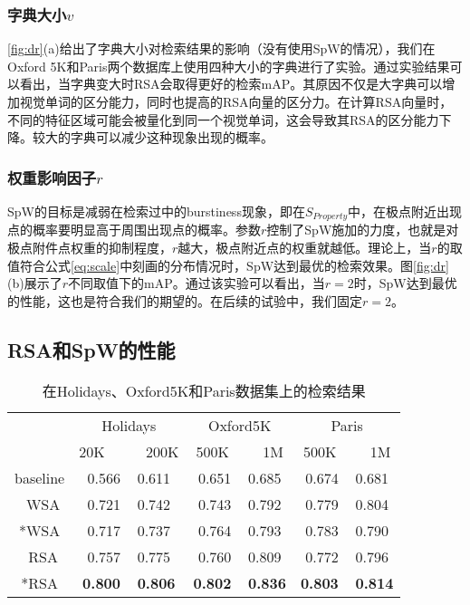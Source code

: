 \subsubsection{字典大小$v$}
\ref{fig:dr}(a)给出了字典大小对检索结果的影响（没有使用SpW的情况），我们在Oxford 5K和Paris两个数据库上使用四种大小的字典进行了实验。通过实验结果可以看出，当字典变大时RSA会取得更好的检索mAP。其原因不仅是大字典可以增加视觉单词的区分能力，同时也提高的RSA向量的区分力。在计算RSA向量时，不同的特征区域可能会被量化到同一个视觉单词，这会导致其RSA的区分能力下降。较大的字典可以减少这种现象出现的概率。

\subsubsection{权重影响因子$r$}
SpW的目标是减弱在检索过中的burstiness现象，即在$S_{Property}$中，在极点附近出现点的概率要明显高于周围出现点的概率。参数$r$控制了SpW施加的力度，也就是对极点附件点权重的抑制程度，$r$越大，极点附近点的权重就越低。理论上，当$r$的取值符合公式\ref{eq:scale}中刻画的分布情况时，SpW达到最优的检索效果。图\ref{fig:dr}(b)展示了$r$不同取值下的mAP。通过该实验可以看出，当$r=2$时，SpW达到最优的性能，这也是符合我们的期望的。在后续的试验中，我们固定$r=2$。

\subsection{RSA和SpW的性能}
\begin{table}
	\begin{center}
		\begin{tabular}{|c|c|c|c|}
			\hline
			& Holidays       & Oxford5K         & Paris\\
			& 20K~~~~~ 200K  & 500K~~~~ 1M    & 500K~~~~ 1M\\
			\hline\hline
			baseline  & 0.566 ~ 0.611  & 0.651 ~ 0.685  & 0.674 ~ 0.681\\
			\hline
			~WSA      & 0.721 ~ 0.742  & 0.743 ~ 0.792  & 0.779 ~ 0.804\\
			*WSA      & 0.717 ~ 0.737  & 0.764 ~ 0.793  & 0.783 ~ 0.790\\
			\hline
			~RSA      & 0.757 ~ 0.775  & 0.760 ~ 0.809  & 0.772 ~ 0.796\\
			*RSA      & \textbf{0.800} ~ \textbf{0.806} & \textbf{0.802} ~ \textbf{0.836} & \textbf{0.803} ~ \textbf{0.814}\\
			\hline
		\end{tabular}
	\end{center}
	\caption{在Holidays、Oxford5K和Paris数据集上的检索结果}
	\label{tab:map1}
\end{table}

